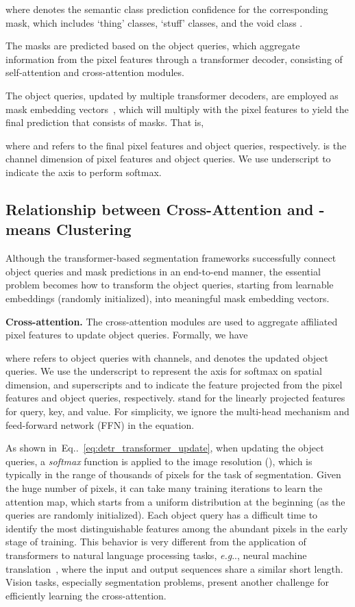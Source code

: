 \documentclass[runningheads]{llncs}
\makeatletter
\DeclareRobustCommand\onedot{\futurelet\@let@token\@onedot}
\def\@onedot{\ifx\@let@token.\else.\null\fi\xspace}
\def\eg{\emph{e.g}\onedot} \def\Eg{\emph{E.g}\onedot}
\newcommand{\equref}[1]{Eq\onedot~\eqref{#1}}
\makeatother
\begin{document}
where  denotes the semantic class prediction confidence for the corresponding mask, which includes `thing' classes, `stuff' classes, and the void class .

The  masks are predicted based on the  object queries, which aggregate information from the pixel features through a transformer decoder, consisting of self-attention and cross-attention modules.

The object queries, updated by multiple transformer decoders, are employed as mask embedding vectors~\cite{jia2016dynamic,tian2020conditional,wang2020solov2}, which will multiply with the pixel features to yield the final prediction  that consists of  masks. That is,

where  and  refers to the final pixel features and object queries, respectively.  is the channel dimension of pixel features and object queries. We use underscript  to indicate the axis to perform softmax.

\subsection{Relationship between Cross-Attention and -means Clustering}
Although the transformer-based segmentation frameworks successfully connect object queries and mask predictions in an end-to-end manner, the essential problem becomes how to transform the object queries, starting from learnable embeddings (randomly initialized), into meaningful mask embedding vectors.

{\bf Cross-attention.}\quad
The cross-attention modules are used to aggregate affiliated pixel features to update object queries. Formally, we have

where  refers to  object queries with  channels, and  denotes the updated object queries. We use the underscript  to represent the axis for softmax on spatial dimension, and superscripts  and  to indicate the feature projected from the pixel features and object queries, respectively.  stand for the linearly projected features for query, key, and value. For simplicity, we ignore the multi-head mechanism and feed-forward network (FFN) in the equation.

As shown in~\equref{eq:detr_transformer_update}, when updating the object queries, a \textit{softmax} function is applied to the image resolution (), which is typically in the range of thousands of pixels for the task of segmentation. Given the huge number of pixels, it can take many training iterations to learn the attention map, which starts from a uniform distribution at the beginning (as the queries are randomly initialized). Each object query has a difficult time to identify the most distinguishable features among the abundant pixels in the early stage of training.
This behavior is very different from the application of transformers to natural language processing tasks, \eg, neural machine translation~\cite{sutskever2014sequence,bahdanau2014neural}, where the input and output sequences share a similar short length.
Vision tasks, especially segmentation problems, present another challenge for efficiently learning the cross-attention.
\end{document}
